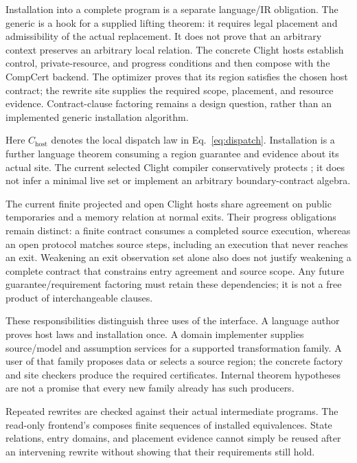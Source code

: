 Installation into a complete program is a separate language/IR obligation.
The generic  is a hook for a supplied lifting theorem:
it requires legal placement and admissibility of the actual replacement. It
does not prove that an arbitrary context preserves an arbitrary local relation.
The concrete Clight hosts establish control, private-resource, and progress
conditions and then compose with the CompCert backend.
The optimizer proves that its region satisfies the chosen host contract; the
rewrite site supplies the required scope, placement, and resource evidence.
Contract-clause factoring remains a design question, rather than an implemented
generic installation algorithm.

Here $C_{\mathrm{host}}$ denotes the local dispatch law in
Eq.~\eqref{eq:dispatch}. Installation is a further language theorem consuming a
region guarantee and evidence about its actual site. The current selected
Clight compiler conservatively protects ; it does not infer
a minimal live set or implement an arbitrary boundary-contract algebra.

The current finite projected and open Clight hosts share agreement on public
temporaries and a memory relation at normal exits. Their progress obligations
remain distinct: a finite contract consumes a completed source execution,
whereas an open protocol matches source steps, including an execution that
never reaches an exit. Weakening an exit observation set alone also does not
justify weakening a complete contract that constrains entry agreement and
source scope. Any future guarantee/requirement factoring must retain these
dependencies; it is not a free product of interchangeable clauses.

These responsibilities distinguish three uses of the interface. A language
author proves host laws and installation once. A domain implementer supplies
source/model and assumption services for a supported transformation family.
A user of that family proposes data or selects a source region; the concrete
factory and site checkers produce the required certificates. Internal theorem
hypotheses are not a promise that every new family already has such producers.

Repeated rewrites are checked against their actual intermediate programs.
The read-only frontend's  composes
finite sequences of installed equivalences. State relations, entry domains,
and placement evidence cannot simply be reused after an intervening rewrite
without showing that their requirements still hold.

